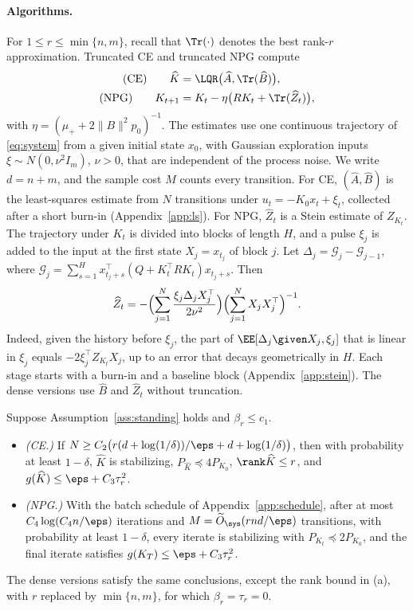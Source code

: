 \paragraph{Algorithms.}
For $1\le r\le\min\{n,m\}$, recall that $\Tr(\cdot)$ denotes the best
rank-$r$ approximation. Truncated CE and truncated NPG compute
\begin{align}
 \text{(CE)}\qquad \widehat K&=\LQR\bigl(\widehat A,\Tr(\widehat B)\bigr),
 \label{eq:tce}\\
 \text{(NPG)}\qquad K_{t+1}&=K_t-\eta\bigl(RK_t+\Tr(\widehat Z_t)\bigr),
 \label{eq:tnpg}
\end{align}
with $\eta=(\mu_++2\|B\|^2p_0)^{-1}$. The estimates use one continuous
trajectory of \eqref{eq:system} from a given initial state $x_0$, with
Gaussian exploration inputs $\xi\sim N(0,\nu^2I_m)$, $\nu>0$, that are
independent of the process noise. We write $d=n+m$, and the sample cost $M$ counts
every transition. For CE, $(\widehat A,\widehat B)$ is the least-squares
estimate from $N$ transitions under $u_t=-K_0x_t+\xi_t$, collected
after a short burn-in (Appendix~\ref{app:ls}). For NPG,
$\widehat Z_t$ is a Stein estimate of $Z_{K_t}$. The trajectory under
$K_t$ is divided into blocks of length $H$, and a pulse $\xi_j$ is added
to the input at the first state $X_j=x_{t_j}$ of block $j$. Let
$\Delta_j=\mathcal G_j-\mathcal G_{j-1}$, where
$\mathcal G_j=\sum_{s=1}^Hx_{t_j+s}^\top(Q+K_t^\top RK_t)x_{t_j+s}$. Then
\begin{equation}\label{eq:stein}
 \widehat Z_t=-\Bigl(\sum_{j=1}^N\dfrac{\xi_j\Delta_jX_j^\top}{2\nu^2}\Bigr)
 \Bigl(\sum_{j=1}^NX_jX_j^\top\Bigr)^{-1}.
\end{equation}
Indeed, given the history before $\xi_j$, the part of
$\EE[\Delta_j\given X_j,\xi_j]$ that is linear in $\xi_j$ equals
$-2\xi_j^\top Z_{K_t}X_j$, up to an error that decays geometrically in
$H$. Each stage starts with a burn-in and a baseline block
(Appendix~\ref{app:stein}). The dense versions use $\widehat B$ and $\widehat Z_t$
without truncation.

\begin{theorem}\label{thm:e2e}
Suppose Assumption~\ref{ass:standing} holds and $\beta_r\le c_1$.
\begin{itemize}
\item[(a)] \emph{(CE.)} If
$N\ge C_2\bigl(r(d+\log(1/\delta))/\eps+d+\log(1/\delta)\bigr)$, then
with probability at least $1-\delta$, $\widehat K$ is stabilizing,
$P_{\widehat K}\preceq4P_{K_0}$, $\rank\widehat K\le r$, and
$g(\widehat K)\le\eps+C_3\tau_r^2$.
\item[(b)] \emph{(NPG.)} With the batch schedule of Appendix~\ref{app:schedule}, after
at most $C_4\log(C_4n/\eps)$ iterations and
$M=\widetilde O_{\sys}(rnd/\eps)$ transitions, with probability at least
$1-\delta$, every iterate is stabilizing with $P_{K_t}\preceq2P_{K_0}$,
and the final iterate satisfies $g(K_T)\le\eps+C_3\tau_r^2$.
\end{itemize}
The dense versions satisfy the same conclusions, except the rank bound
in (a), with $r$ replaced by $\min\{n,m\}$, for which $\beta_r=\tau_r=0$.
\end{theorem}

